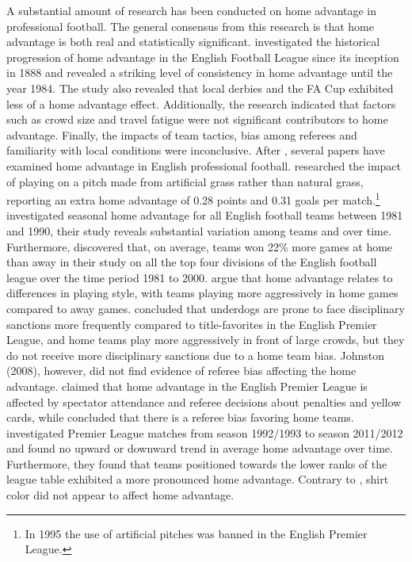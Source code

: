  A substantial amount of research has been conducted on home advantage in professional football. The general consensus from this research is that home advantage is both real and statistically significant.  investigated the historical progression of home advantage in the English Football League since its inception in 1888 and revealed a striking level of consistency in home advantage until the year 1984. The study also revealed that local derbies and the FA Cup exhibited less of a home advantage effect. Additionally, the research indicated that factors such as crowd size and travel fatigue were not significant contributors to home advantage. Finally, the impacts of team tactics, bias among referees and familiarity with local conditions were inconclusive. After , several papers have examined home advantage in English professional football.  researched the impact of playing on a pitch made from artificial grass rather than natural grass, reporting an extra home advantage of 0.28 points and 0.31 goals per match.\footnote{In 1995 the use of artificial pitches was banned in the English Premier League.}  investigated seasonal home advantage for all English football teams between 1981 and 1990, their study reveals substantial variation among teams and over time. Furthermore,  discovered that, on average, teams won 22\% more games at home than away in their study on all the top four divisions of the English football league over the time period 1981 to 2000.  argue that home advantage relates to differences in playing style, with teams playing more aggressively in home games compared to away games.  concluded that underdogs are prone to face disciplinary sanctions more frequently compared to title-favorites in the English Premier League, and home teams play more aggressively in front of large crowds, but they do not receive more disciplinary sanctions due to a home team bias. Johnston (2008), however, did not find evidence of referee bias affecting the home advantage.  claimed that home advantage in the English Premier League is affected by spectator attendance and referee decisions about penalties and yellow cards, while  concluded that there is a referee bias favoring home teams.  investigated Premier League matches from season 1992/1993 to season 2011/2012 and found no upward or downward trend in average home advantage over time. Furthermore, they found that teams positioned towards the lower ranks of the league table exhibited a more pronounced home advantage. Contrary to , shirt color did not appear to affect home advantage.\\

